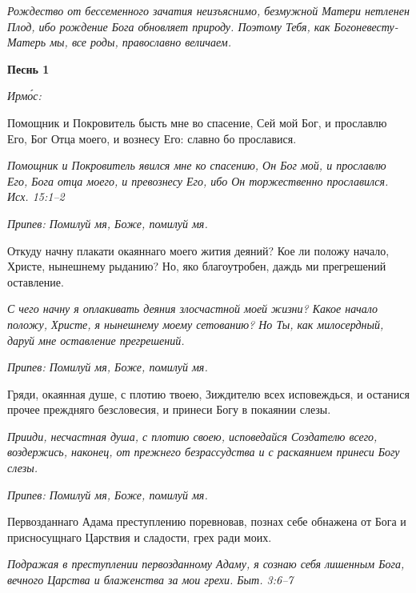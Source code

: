 \itshape Рождество от бессеменного зачатия неизъяснимо, безмужной Матери нетленен Плод, ибо рождение Бога обновляет природу. Поэтому Тебя, как Богоневесту-Матерь мы, все роды, православно величаем.\normalfont{}




\mychapterending








\bfseries Песнь 1\normalfont{}


\itshape Ирмо́с:\normalfont{}


Помощник и Покровитель бысть мне во спасение, Сей мой Бог, и прославлю Его, Бог Отца моего, и вознесу Его: славно бо прославися.


\itshape Помощник и Покровитель явился мне ко спасению, Он Бог мой, и прославлю Его, Бога отца моего, и превознесу Его, ибо Он торжественно прославился. Исх. 15:1–2\normalfont{}


\itshape Припев:\normalfont{} Помилуй мя, Боже, помилуй мя.


Откуду начну плакати окаяннаго моего жития деяний? Кое ли положу начало, Христе, нынешнему рыданию? Но, яко благоутробен, даждь ми прегрешений оставление.


\itshape С чего начну я оплакивать деяния злосчастной моей жизни? Какое начало положу, Христе, я нынешнему моему сетованию? Но Ты, как милосердный, даруй мне оставление прегрешений.\normalfont{}


\itshape Припев:\normalfont{} Помилуй мя, Боже, помилуй мя.


Гряди, окаянная душе, с плотию твоею, Зиждителю всех исповеждься, и останися прочее преждняго безсловесия, и принеси Богу в покаянии слезы.


\itshape Прииди, несчастная душа, с плотию своею, исповедайся Создателю всего, воздержись, наконец, от прежнего безрассудства и с раскаянием принеси Богу слезы.\normalfont{}


\itshape Припев:\normalfont{} Помилуй мя, Боже, помилуй мя.


Первозданнаго Адама преступлению поревновав, познах себе обнажена от Бога и присносущнаго Царствия и сладости, грех ради моих.


\itshape Подражая в преступлении первозданному Адаму, я сознаю себя лишенным Бога, вечного Царства и блаженства за мои грехи. Быт. 3:6–7\normalfont{}


